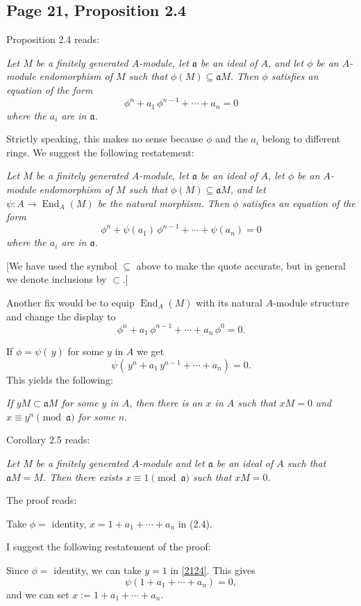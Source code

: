 \documentclass[parskip=half,fontsize=12pt]{scrartcl}%
\newcommand{\oo}{\operatorname}\newcommand{\ooo}{\operatorname*}
\newcommand{\mf}{\mathfrak}
\newcommand{\aaa}{\mf a}
\begin{document}
\subsection{Page 21, Proposition 2.4}\label{24}%

Proposition 2.4 reads:

\emph{Let $M$ be a finitely generated $A$-module, let $\mf a$ be an ideal of $A$, and let $\phi$ be an $A$-module endomorphism of $M$ such that $\phi(M)\subseteq\aaa M$. Then $\phi$ satisfies an equation of the form
$$
\phi^n+a_1\,\phi^{n-1}+\cdots+a_n=0
$$ 
where the $a_i$ are in $\mf a$.}

Strictly speaking, this makes no sense because $\phi$ and the $a_i$ belong to different rings. We suggest the following restatement:

\emph{Let $M$ be a finitely generated $A$-module, let $\aaa$ be an ideal of $A$, let $\phi$ be an $A$-module endomorphism of $M$ such that $\phi(M)\subseteq\aaa M$, and let $\psi:A\to\oo{End}_A(M)$ be the natural morphism. Then $\phi$ satisfies an equation of the form
$$
\phi^n+\psi(a_1)\,\phi^{n-1}+\cdots+\psi(a_n)=0
$$ 
where the $a_i$ are in $\aaa$.}

[We have used the symbol $\subseteq$ above to make the quote accurate, but in general we denote inclusions by $\subset$.]

Another fix would be to equip $\operatorname{End}_A(M)$ with its natural $A$-module structure and change the display to 
$$
\phi^n+a_1\,\phi^{n-1}+\cdots+a_n\,\phi^0=0.
$$

If $\phi=\psi(\,y)$ for some $y$ in $A$ we get 
\begin{equation}\label{2124}
\psi(\,y^n+a_1\,y^{n-1}+\cdots+a_n)=0.
\end{equation}
This yields the following:

\emph{If $yM\subset\aaa M$ for some $y$ in $A$, then there is an $x$ in $A$ such that $xM=0$ and $x\equiv y^n\pmod{\aaa}$ for some $n$.}

Corollary 2.5 reads:

\emph{Let $M$ be a finitely generated $A$-module and let $\aaa$ be an ideal of $A$ such that $\aaa M=M$. Then there exists $x\equiv1\pmod{\aaa}$ such that $xM=0$.}

The proof reads:

Take $\phi=$ identity, $x=1+a_1+\cdots+a_n$ in (2.4).

I suggest the following restatement of the proof:

Since $\phi=$ identity, we can take $y=1$ in \eqref{2124}. This gives 
$$
\psi(1+a_1+\cdots+a_n)=0,
$$ 
and we can set $x:=1+a_1+\cdots+a_n$.
\end{document}
